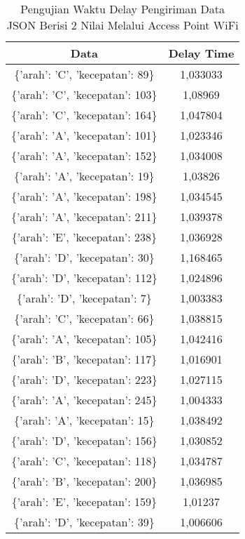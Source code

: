 \begin{table}[!h]
\centering
  \caption{Pengujian Waktu Delay Pengiriman Data JSON Berisi 2 Nilai Melalui Access Point WiFi}
  \label{tbl:delayWiFiJSON}
  \begin{tabular}{|c|c|}
  \hline
  Data                              & Delay Time  \\ \hline
  \{'arah': 'C', 'kecepatan': 89\}  & 1,033033    \\ \hline
  \{'arah': 'C', 'kecepatan': 103\} & 1,08969     \\ \hline
  \{'arah': 'C', 'kecepatan': 164\} & 1,047804    \\ \hline
  \{'arah': 'A', 'kecepatan': 101\} & 1,023346    \\ \hline
  \{'arah': 'A', 'kecepatan': 152\} & 1,034008    \\ \hline
  \{'arah': 'A', 'kecepatan': 19\}  & 1,03826     \\ \hline
  \{'arah': 'A', 'kecepatan': 198\} & 1,034545    \\ \hline
  \{'arah': 'A', 'kecepatan': 211\} & 1,039378    \\ \hline
  \{'arah': 'E', 'kecepatan': 238\} & 1,036928    \\ \hline
  \{'arah': 'D', 'kecepatan': 30\}  & 1,168465    \\ \hline
  \{'arah': 'D', 'kecepatan': 112\} & 1,024896    \\ \hline
  \{'arah': 'D', 'kecepatan': 7\}   & 1,003383    \\ \hline
  \{'arah': 'C', 'kecepatan': 66\}  & 1,038815    \\ \hline
  \{'arah': 'A', 'kecepatan': 105\} & 1,042416    \\ \hline
  \{'arah': 'B', 'kecepatan': 117\} & 1,016901    \\ \hline
  \{'arah': 'D', 'kecepatan': 223\} & 1,027115    \\ \hline
  \{'arah': 'A', 'kecepatan': 245\} & 1,004333    \\ \hline
  \{'arah': 'A', 'kecepatan': 15\}  & 1,038492    \\ \hline
  \{'arah': 'D', 'kecepatan': 156\} & 1,030852    \\ \hline
  \{'arah': 'C', 'kecepatan': 118\} & 1,034787    \\ \hline
  \{'arah': 'B', 'kecepatan': 200\} & 1,036985    \\ \hline
  \{'arah': 'E', 'kecepatan': 159\} & 1,01237     \\ \hline
  \{'arah': 'D', 'kecepatan': 39\}  & 1,006606    \\ \hline

\end{tabular}
\end{table}
